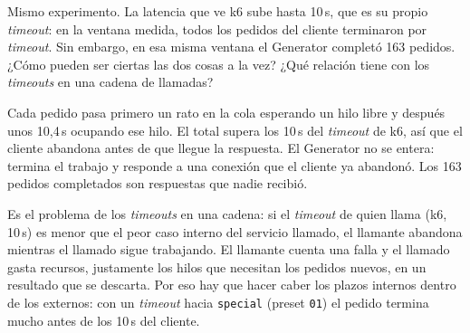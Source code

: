 \documentclass[variant=guia,cover=institutional,mode=screen]{ua-engineering-v6-article}
\begin{document}
\begin{uaexercise}
Mismo experimento. La latencia que ve k6 sube hasta 10\,s, que es su propio \emph{timeout}: en la ventana medida, todos los pedidos del cliente terminaron por \emph{timeout}. Sin embargo, en esa misma ventana el Generator completó 163 pedidos.
¿Cómo pueden ser ciertas las dos cosas a la vez? ¿Qué relación tiene con los \emph{timeouts} en una cadena de llamadas?
\end{uaexercise}
\begin{uaanswer}
Cada pedido pasa primero un rato en la cola esperando un hilo libre y después unos 10,4\,s ocupando ese hilo. El total supera los 10\,s del \emph{timeout} de k6, así que el cliente abandona antes de que llegue la respuesta. El Generator no se entera: termina el trabajo y responde a una conexión que el cliente ya abandonó. Los 163 pedidos completados son respuestas que nadie recibió.

Es el problema de los \emph{timeouts} en una cadena: si el \emph{timeout} de quien llama (k6, 10\,s) es menor que el peor caso interno del servicio llamado, el llamante abandona mientras el llamado sigue trabajando. El llamante cuenta una falla y el llamado gasta recursos, justamente los hilos que necesitan los pedidos nuevos, en un resultado que se descarta. Por eso hay que hacer caber los plazos internos dentro de los externos: con un \emph{timeout} hacia \texttt{special} (preset \texttt{01}) el pedido termina mucho antes de los 10\,s del cliente.
\end{uaanswer}
\end{document}
